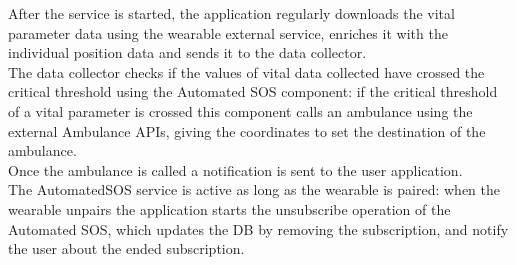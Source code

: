 After the service is started, the application regularly downloads the vital parameter data using the wearable external service, enriches it with the individual position data and sends it to the data collector.\\
The data collector checks if the values of vital data collected have crossed the critical threshold using the Automated SOS component: if the critical threshold of a vital parameter is crossed this component calls an ambulance using the external Ambulance APIs, giving the coordinates to set the destination of the ambulance.\\
Once the ambulance is called a notification is sent to the user application.\\
The AutomatedSOS service is active as long as the wearable is paired: when the wearable unpairs the application starts the unsubscribe operation of the Automated SOS, which updates the DB by removing the subscription, and notify the user about the ended subscription.



